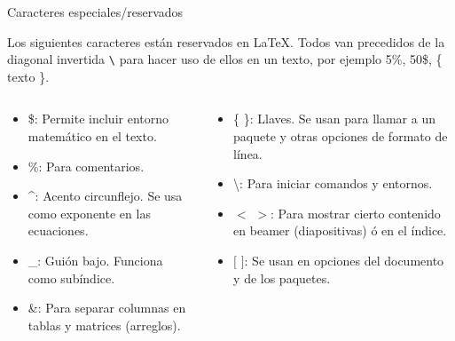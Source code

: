 \documentclass[aspectratio=169, 10pt]{beamer}
\begin{document}
\begin{frame}[fragile]{Caracteres especiales/reservados}

Los siguientes caracteres están reservados en \LaTeX. Todos van precedidos de la diagonal invertida \verb|\| para hacer uso de ellos en un texto, por ejemplo 5\%, 50\$, \{ texto \}.

    \begin{columns}
        \begin{column}{.5\linewidth}  
    \begin{itemize}
\item \$: Permite incluir entorno matemático en el texto.
\item \%: Para comentarios.
\item \^{}: Acento circunflejo. Se usa como exponente en las ecuaciones.
\item \_: Guión bajo. Funciona como subíndice.
\item \&: Para separar columnas en tablas y matrices (arreglos).


\end{itemize}
\end{column}

\begin{column}{.5\linewidth} 
    \begin{itemize}
        \item \{ \}: Llaves. Se usan para llamar a un paquete y otras opciones de formato de línea.
        \item \textbackslash: \hspace{0.5mm} Para iniciar comandos y entornos.
        \item $<$ $>$: Para mostrar cierto contenido en beamer (diapositivas) ó en el índice.
        \item $[$ $]$: Se usan en opciones del documento y de los paquetes.
    \end{itemize}
\end{column}
\end{columns}
\end{frame}
\end{document}
